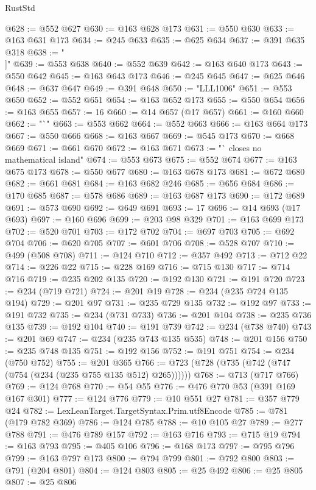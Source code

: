 \begin{lexlean}{RustStd}
\begin{coremodule}
@628 := @552 @627
@630 := @163 @628 @173
@631 := @550 @630
@633 := @163 @631 @173
@634 := @245 @633
@635 := @625 @634
@637 := @391 @635 @318
@638 := "\\]"
@639 := @553 @638
@640 := @552 @639
@642 := @163 @640 @173
@643 := @550 @642
@645 := @163 @643 @173
@646 := @245 @645
@647 := @625 @646
@648 := @637 @647
@649 := @391 @648
@650 := "LLL1006"
@651 := @553 @650
@652 := @552 @651
@654 := @163 @652 @173
@655 := @550 @654
@656 := @163 @655
@657 := 16
@660 := @14 @657 (@17 @657)
@661 := @160 @660
@662 := "`"
@663 := @553 @662
@664 := @552 @663
@666 := @163 @664 @173
@667 := @550 @666
@668 := @163 @667
@669 := @545 @173
@670 := @668 @669
@671 := @661 @670
@672 := @163 @671
@673 := "` closes no mathematical island"
@674 := @553 @673
@675 := @552 @674
@677 := @163 @675 @173
@678 := @550 @677
@680 := @163 @678 @173
@681 := @672 @680
@682 := @661 @681
@684 := @163 @682 @246
@685 := @656 @684
@686 := @170 @685
@687 := @578 @686
@689 := @163 @687 @173
@690 := @172 @689
@691 := @573 @690
@692 := @649 @691
@693 := 17
@696 := @14 @693 (@17 @693)
@697 := @160 @696
@699 := @203 @98 @329
@701 := @163 @699 @173
@702 := @520 @701
@703 := @172 @702
@704 := @697 @703
@705 := @692 @704
@706 := @620 @705
@707 := @601 @706
@708 := @528 @707
@710 := @499 (@508 @708)
@711 := @124 @710
@712 := @357 @492
@713 := @712 @22
@714 := @226 @22
@715 := @228 @169
@716 := @715 @130
@717 := @714 @716
@719 := @235 @202 @135
@720 := @192 @130
@721 := @191 @720
@723 := @234 (@719 @721)
@724 := @201 @19
@728 := @234 (@235 @724 @135 @194)
@729 := @201 @97
@731 := @235 @729 @135
@732 := @192 @97
@733 := @191 @732
@735 := @234 (@731 @733)
@736 := @201 @104
@738 := @235 @736 @135
@739 := @192 @104
@740 := @191 @739
@742 := @234 (@738 @740)
@743 := @201 @69
@747 := @234 (@235 @743 @135 @535)
@748 := @201 @156
@750 := @235 @748 @135
@751 := @192 @156
@752 := @191 @751
@754 := @234 (@750 @752)
@755 := @201 @365
@766 := @723 (@728 (@735 (@742 (@747 (@754 (@234 (@235 @755 @135 @512) @265))))))
@768 := @713 (@717 @766)
@769 := @124 @768
@770 := @54 @55
@776 := @476 @770 @53 (@391 @169 @167 @301)
@777 := @124 @776
@779 := @10 @551 @27
@781 := @357 @779 @24
@782 := LexLeanTarget.TargetSyntax.Prim.utf8Encode
@785 := @781 (@179 @782 @369)
@786 := @124 @785
@788 := @10 @105 @27
@789 := @277 @788
@791 := @476 @789 @157
@792 := @163 @716
@793 := @715 @19
@794 := @163 @793
@795 := @405 @106
@796 := @168 @173
@797 := @795 @796
@799 := @163 @797 @173
@800 := @794 @799
@801 := @792 @800
@803 := @791 (@204 @801)
@804 := @124 @803
@805 := @25 @492
@806 := @25 @805
@807 := @25 @806

\end{coremodule}
\end{lexlean}
